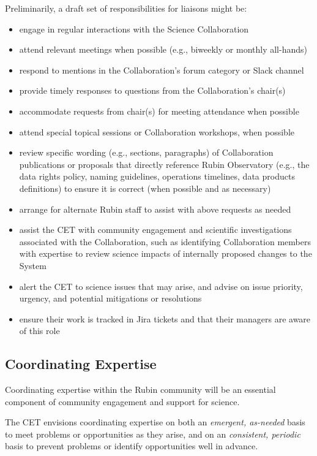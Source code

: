 \documentclass[DM,lsstdraft,toc]{lsstdoc}
\begin{document}
Preliminarily, a draft set of responsibilities for liaisons might be:
\begin{itemize}
\item engage in regular interactions with the Science Collaboration
\item attend relevant meetings when possible (e.g., biweekly or monthly all-hands)
\item respond to mentions in the Collaboration's forum category or Slack channel
\item provide timely responses to questions from the Collaboration's chair(s)
\item accommodate requests from chair(s) for meeting attendance when possible
\item attend special topical sessions or Collaboration workshops, when possible
\item review specific wording (e.g., sections, paragraphs) of Collaboration publications or proposals that directly reference Rubin Observatory (e.g., the data rights policy, naming guidelines, operations timelines, data products definitions) to ensure it is correct (when possible and as necessary)
\item arrange for alternate Rubin staff to assist with above requests as needed
\item assist the CET with community engagement and scientific investigations associated with the Collaboration, such as identifying Collaboration members with expertise to review science impacts of internally proposed changes to the System
\item alert the CET to science issues that may arise, and advise on issue priority, urgency, and potential mitigations or resolutions
\item ensure their work is tracked in Jira tickets and that their managers are aware of this role
\end{itemize}



\subsection{Coordinating Expertise}\label{ssec:mod_coord}

Coordinating expertise within the Rubin community will be an essential component of community engagement and support for science.

The CET envisions coordinating expertise on both an \textit{emergent, as-needed} basis to meet problems or opportunities as they arise, and on an \textit{consistent, periodic} basis to prevent problems or identify opportunities well in advance.
\end{document}
